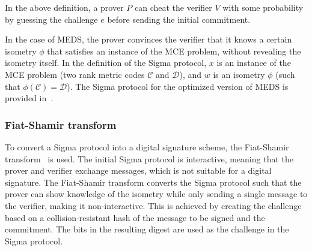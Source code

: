 \documentclass[11pt,a4paper]{report}
\theoremstyle{definition}
\begin{document}
In the above definition, a prover $P$ can cheat the verifier $V$ with some probability by guessing the challenge $e$ before sending the initial commitment.

In the case of MEDS, the prover convinces the verifier that it knows a certain isometry $\phi$ that satisfies an instance of the MCE problem, without revealing the isometry itself. In the definition of the Sigma protocol, $x$ is an instance of the MCE problem (two rank metric codes $\mathcal{C}$ and $\mathcal{D}$), and $w$ is an isometry $\phi$ (such that $\phi(\mathcal{C}) = \mathcal{D}$). The Sigma protocol for the optimized version of MEDS is provided in~\cite[Section~4.2]{chou2024reducing}.

\subsubsection{Fiat-Shamir transform}
\label{sec:fiatshamir}
To convert a Sigma protocol into a digital signature scheme, the Fiat-Shamir transform~\cite{fiat1986prove} is used. The initial Sigma protocol is interactive, meaning that the prover and verifier exchange messages, which is not suitable for a digital signature. The Fiat-Shamir transform converts the Sigma protocol such that the prover can show knowledge of the isometry while only sending a single message to the verifier, making it non-interactive. This is achieved by creating the challenge based on a collision-resistant hash of the message to be signed and the commitment. The bits in the resulting digest are used as the challenge in the Sigma protocol.
\end{document}
